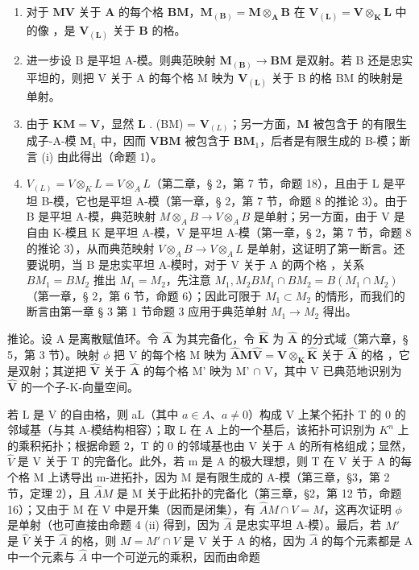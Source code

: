 \begin{enumerate}
\def\labelenumi{(\roman{enumi})}
\item
  对于 \(\mathbf{M}\)\(\mathbf{V}\) 关于 \(\mathbf{A}\) 的每个格 \(\mathbf{BM}\)，\(\mathbf{M}_{(\mathbf{B})} = \mathbf{M} \otimes_{\mathbf{A}} \mathbf{B}\) 在 \(\mathbf{V}_{(\mathbf{L})} = \mathbf{V} \otimes_{\mathbf{K}} \mathbf{L}\) 中的像 ，是 \(\mathbf{V}_{(\mathbf{L})}\) 关于 \(\mathbf{B}\) 的格。
\item
  进一步设 B 是平坦 A-模。则典范映射 \(\mathbf{M}_{(\mathbf{B})}\to\mathbf{BM}\) 是双射。若 B 还是忠实平坦的，则把 V 关于 A 的每个格 M 映为 \(\mathbf{V}_{(\mathbf{L})}\) 关于 B 的格 BM 的映射是单射。
\item
  由于 \(\mathbf{KM} = \mathbf{V}\)，显然 \(\mathbf{L}\) . (BM) = \(\mathbf{V}_{(L)}\)；另一方面，\(\mathbf{M}\) 被包含于  的有限生成子-A-模 \(\mathbf{M}_1\) 中，因而 \(\mathbf{V}\)\(\mathbf{BM}\) 被包含于 \(\mathbf{BM}_1\)，后者是有限生成的 B-模；断言 (i) 由此得出（命题 1）。
\item
  \(V_{(L)} = V \otimes_{K} L = V \otimes_{A} L\)（第二章，§ 2，第 7 节，命题 18），且由于 L 是平坦 B-模，它也是平坦 A-模（第一章，§ 2，第 7 节，命题 8 的推论 3）。由于 B 是平坦 A-模，典范映射 \(M \otimes_{A} B \to V \otimes_{A} B\) 是单射；另一方面，由于 V 是自由 K-模且 K 是平坦 A-模，V 是平坦 A-模（第一章，§ 2，第 7 节，命题 8 的推论 3），从而典范映射 \(V \otimes_{A} B \to V \otimes_{A} L\) 是单射，这证明了第一断言。还要说明，当 B 是忠实平坦 A-模时，对于 V 关于 A 的两个格 ，关系 \(BM_{1} = BM_{2}\) 推出 \(M_{1} = M_{2}\)，先注意 \(M_{1}, M_{2}\)\(BM_{1} \cap BM_{2} = B(M_{1} \cap M_{2})\)（第一章，§ 2，第 6 节，命题 6）；因此可限于 \(M_{1} \subset M_{2}\) 的情形，而我们的断言由第一章 § 3 第 1 节命题 3 应用于典范单射 \(M_{1} \to M_{2}\) 得出。
\end{enumerate}

推论。设 A 是离散赋值环。令 \(\hat{\mathbf{A}}\) 为其完备化，令 \(\hat{\mathbf{K}}\) 为 \(\hat{\mathbf{A}}\) 的分式域（第六章，§ 5，第 3 节）。映射 \(\phi\) 把 V 的每个格 M 映为 \(\hat{\mathbf{A}}\mathbf{M}\)\(\hat{\mathbf{V}} = \mathbf{V} \otimes_{\mathbf{K}} \hat{\mathbf{K}}\) 关于 \(\hat{\mathbf{A}}\) 的格 ，它是双射；其逆把 \(\hat{\mathbf{V}}\) 关于 \(\hat{\mathbf{A}}\) 的每个格 M' 映为 M' \(\cap\) V，其中 V 已典范地识别为 \(\hat{\mathbf{V}}\) 的一个子-K-向量空间。

若 L 是 V 的自由格，则 aL（其中 \(a \in A\)、\(a \neq 0\)）构成 V 上某个拓扑 T 的 0 的邻域基（与其 A-模结构相容）；取 L 在 A 上的一个基后，该拓扑可识别为 \(K^{n}\) 上的乘积拓扑；根据命题 2，T 的 0 的邻域基也由 V 关于 A 的所有格组成；显然，\(\hat{V}\) 是 V 关于 T 的完备化。此外，若 m 是 A 的极大理想，则 T 在 V 关于 A 的每个格 M 上诱导出 m-进拓扑，因为 M 是有限生成的 A-模（第三章，§3，第 2 节，定理 2），且 \(\hat{A}M\) 是 M 关于此拓扑的完备化（第三章，§2，第 12 节，命题 16）；又由于 M 在 V 中是开集（因而是闭集），有 \(\hat{A}M \cap V = M\)，这再次证明 \(\phi\) 是单射（也可直接由命题 4 (ii) 得到，因为 \(\hat{A}\) 是忠实平坦 A-模）。最后，若 \(M'\) 是 \(\hat{V}\) 关于 \(\hat{A}\) 的格，则 \(M = M' \cap V\) 是 V 关于 A 的格，因为 \(\hat{A}\) 的每个元素都是 A 中一个元素与 \(\hat{A}\) 中一个可逆元的乘积，因而由命题

